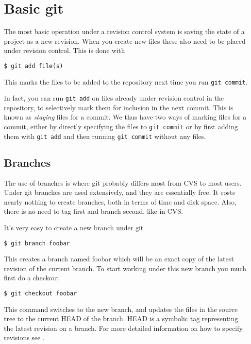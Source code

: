 \documentclass[a4paper,10pt]{article}
\begin{document}
\section{Basic git}
The most basic operation under a revision control system is saving the state of
a project as a new revision. When you create new files  
these also need to be placed under revision control. This is done with
\begin{verbatim}
$ git add file(s)
\end{verbatim}
This marks the files to be added to the repository next time you run 
\texttt{git commit}. 

In fact, you can run \texttt{git add} on files already
under revision control in the repository, to selectively mark them for
inclusion in the next commit. This is known as \emph{staging} files for a
commit. We thus have two ways of marking files for a commit, either by
directly specifying the files to \texttt{git commit} or by first adding them
with \texttt{git add} and then running \texttt{git commit} without any files. 

\subsection{Branches}
The use of branches is where git probably differs most from CVS to most users.
Under git branches are used extensively, and they are essentially
free. It costs nearly nothing to create branches, both in terms of time and
disk space. Also, there is no need to tag first and branch second, like in CVS.

It's very easy to create a new branch under git
\begin{verbatim}
$ git branch foobar
\end{verbatim}
This creates a branch named foobar which will be an exact copy of the latest
revision of the current branch. To start working under this new branch you
much first do a checkout
\begin{verbatim}
$ git checkout foobar
\end{verbatim}
This command switches to the new branch, and updates the files in the source
tree to the current HEAD of the branch. HEAD is a symbolic tag representing
the latest revision on a branch. For more detailed information on how to
specify revisions see .
\end{document}
